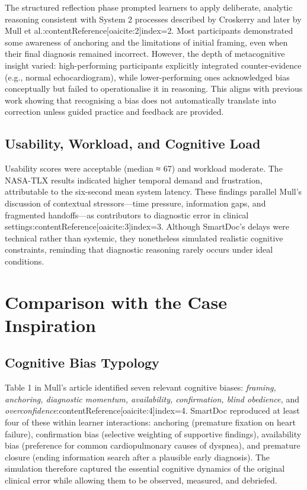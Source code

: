 The structured reflection phase prompted learners to apply deliberate,
analytic reasoning consistent with System 2 processes described by Croskerry
and later by Mull et al.:contentReference[oaicite:2]{index=2}.
Most participants demonstrated some awareness of anchoring and the
limitations of initial framing, even when their final diagnosis remained incorrect.
However, the depth of metacognitive insight varied:
high-performing participants explicitly integrated counter-evidence
(e.g., normal echocardiogram), while lower-performing ones
acknowledged bias conceptually but failed to operationalise it in reasoning.
This aligns with previous work showing that recognising a bias does not
automatically translate into correction unless guided practice and feedback are provided.

\subsection{Usability, Workload, and Cognitive Load}

Usability scores were acceptable (median ≈ 67) and workload moderate.
The NASA-TLX results indicated higher temporal demand and frustration,
attributable to the six-second mean system latency.  
These findings parallel Mull’s discussion of contextual stressors—time pressure,
information gaps, and fragmented handoffs—as contributors to diagnostic error
in clinical settings:contentReference[oaicite:3]{index=3}.  
Although SmartDoc’s delays were technical rather than systemic, they
nonetheless simulated realistic cognitive constraints, reminding that
diagnostic reasoning rarely occurs under ideal conditions.

\section{Comparison with the Case Inspiration}

\subsection{Cognitive Bias Typology}

Table 1 in Mull’s article identified seven relevant cognitive biases:
\emph{framing, anchoring, diagnostic momentum, availability, confirmation,
blind obedience,} and \emph{overconfidence}:contentReference[oaicite:4]{index=4}.  
SmartDoc reproduced at least four of these within learner interactions:
anchoring (premature fixation on heart failure),
confirmation bias (selective weighting of supportive findings),
availability bias (preference for common cardiopulmonary causes of dyspnea),
and premature closure (ending information search after a plausible early diagnosis).
The simulation therefore captured the essential cognitive dynamics of the original
clinical error while allowing them to be observed, measured, and debriefed.

